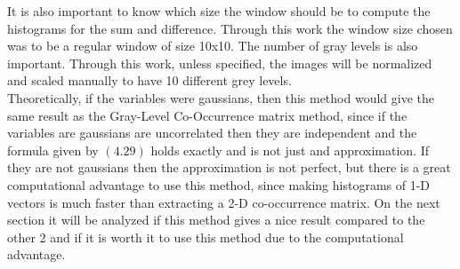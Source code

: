 It is also important to know which size the window should be to compute the histograms for the sum and difference. Through this work the window size chosen was to be a regular window of size 10x10.
The number of gray levels is also important. Through this work, unless specified, the images will be normalized and scaled manually to have 10 different grey levels.
\\
Theoretically, if the variables were gaussians, then this method would give the same result as the Gray-Level Co-Occurrence matrix method, since if the variables are gaussians are uncorrelated then they are independent and the formula given by $(4.29)$ holds exactly and is not just and approximation. If they are not gaussians then the approximation is not perfect, but there is a great computational advantage to use this method, since making histograms of 1-D vectors is much faster than extracting a 2-D co-occurrence matrix. On the next section it will be analyzed if this method gives a nice result compared to the other 2 and if it is worth it to use this method due to the computational advantage.
